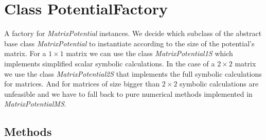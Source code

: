 
\section{Class PotentialFactory}

    \label{PotentialFactory:PotentialFactory}
A factory for \textit{MatrixPotential} instances. We decide which subclass
of the abstract base class \textit{MatrixPotential} to instantiate
according to the size of the potential's matrix. For a $1 \times 1$
matrix we can use the class \textit{MatrixPotential1S} which implements
simplified scalar symbolic calculations. In the case of a $2 \times
2$ matrix we use the class \textit{MatrixPotential2S} that implements the
full symbolic calculations for matrices. And for matrices of size bigger
than $2 \times 2$ symbolic calculations are unfeasible and we have to fall
back to pure numerical methods implemented in \textit{MatrixPotentialMS}.



  \subsection{Methods}

    \label{PotentialFactory:PotentialFactory:create_potential}

    \vspace{0.5ex}

